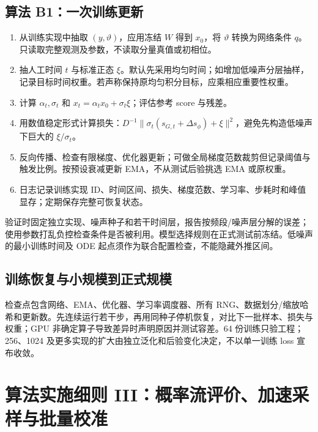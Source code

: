 \documentclass[UTF8,fontset=none,a4paper,11pt]{ctexart}
\newcommand{\chapterpage}[1]{\section{#1}}
\begin{document}
\subsection{算法 B1：一次训练更新}
\begin{enumerate}
\item 从训练实现中抽取 $(y,\vartheta)$，应用冻结 $W$ 得到 $x_0$，将 $\vartheta$ 转换为网络条件 $q$。只读取完整观测及参数，不读取分量真值或初相位。
\item 抽人工时间 $t$ 与标准正态 $\xi$。默认先采用均匀时间；如增加低噪声分层抽样，记录目标时间权重。若声称保持原均匀积分目标，应乘相应重要性权重。
\item 计算 $\alpha_t,\sigma_t$ 和 $x_t=\alpha_t x_0+\sigma_t\xi$；评估参考 score 与残差。
\item 用数值稳定形式计算损失：$D^{-1}\|\sigma_t(s_{G,t}+\Delta s_\phi)+\xi\|^2$，避免先构造低噪声下巨大的 $\xi/\sigma_t$。
\item 反向传播、检查有限梯度、优化器更新；可做全局梯度范数裁剪但记录阈值与触发比例。按预设衰减更新 EMA，不从测试后验挑选 EMA 或原权重。
\item 日志记录训练实现 ID、时间区间、损失、梯度范数、学习率、步耗时和峰值显存；定期保存完整可恢复状态。
\end{enumerate}
验证时固定独立实现、噪声种子和若干时间层，报告按频段/噪声层分解的误差；使用参数打乱负控检查条件是否被利用。模型选择规则在正式测试前冻结。低噪声的最小训练时间及 ODE 起点须作为联合配置检查，不能隐藏外推区间。
\subsection{训练恢复与小规模到正式规模}
检查点包含网络、EMA、优化器、学习率调度器、所有 RNG、数据划分/缩放哈希和更新数。先连续运行若干步，再用同种子停机恢复，对比下一批样本、损失与权重；GPU 非确定算子导致差异时声明原因并测试容差。64 份训练只验工程；256、1024 及更多实现的扩大由独立泛化和后验变化决定，不以单一训练 loss 宣布收敛。
\chapterpage{算法实施细则 III：概率流评价、加速采样与批量校准}
\end{document}
